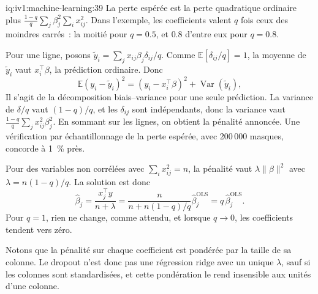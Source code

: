 \begin{solution}{iq:iv1:machine-learning:39}
La perte espérée est la perte quadratique ordinaire plus $\frac{1 - q}{q}\sum_j\beta_j^2\sum_ix_{ij}^2$. Dans l'exemple, les coefficients valent $q$ fois ceux des moindres carrés~: la moitié pour $q = 0.5$, et $0.8$ d'entre eux pour $q = 0.8$.

Pour une ligne, posons $\tilde{y}_i = \sum_j x_{ij}\beta_j\delta_{ij}/q$. Comme $\mathbb{E}[\delta_{ij}/q] = 1$, la moyenne de $\tilde{y}_i$ vaut $x_i^\top\beta$, la prédiction ordinaire. Donc
\[
\mathbb{E}(y_i - \tilde{y}_i)^2 = (y_i - x_i^\top\beta)^2 + \operatorname{Var}(\tilde{y}_i),
\]
Il s'agit de la décomposition biais--variance pour une seule prédiction. La variance de $\delta/q$ vaut $(1 - q)/q$, et les $\delta_{ij}$ sont indépendants, donc la variance vaut $\frac{1 - q}{q}\sum_jx_{ij}^2\beta_j^2$. En sommant sur les lignes, on obtient la pénalité annoncée. Une vérification par échantillonnage de la perte espérée, avec 200\,000 masques, concorde à 1~\% près.

Pour des variables non corrélées avec $\sum_ix_{ij}^2 = n$, la pénalité vaut $\lambda\|\beta\|^2$ avec $\lambda = n(1 - q)/q$. La solution est donc
\[
\hat{\beta}_j = \frac{x_j^\top y}{n + \lambda} = \frac{n}{n + n(1 - q)/q}\hat{\beta}^{\text{OLS}}_j = q\,\hat{\beta}^{\text{OLS}}_j.
\]
Pour $q = 1$, rien ne change, comme attendu, et lorsque $q \to 0$, les coefficients tendent vers zéro.

Notons que la pénalité sur chaque coefficient est pondérée par la taille de sa colonne. Le dropout n'est donc pas une régression ridge avec un unique $\lambda$, sauf si les colonnes sont standardisées, et cette pondération le rend insensible aux unités d'une colonne.



\end{solution}

